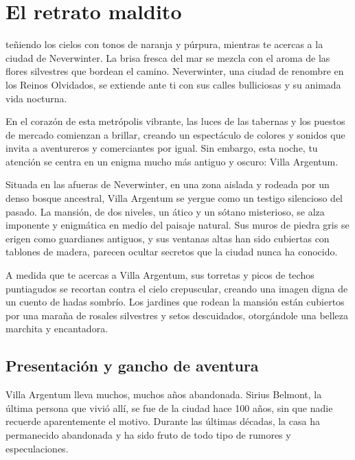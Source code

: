 \documentclass[10pt,twoside,twocolumn,openany]{dndbook}
\begin{document}
\chapter*{El retrato maldito}

 teñiendo los cielos con tonos de naranja y 
púrpura, mientras te acercas a la ciudad de Neverwinter. La brisa fresca del mar se mezcla con 
el aroma de las flores silvestres que bordean el camino. Neverwinter, una ciudad de renombre en los
Reinos Olvidados, se extiende ante ti con sus calles bulliciosas y su animada vida nocturna.

En el corazón de esta metrópolis vibrante, las luces de las tabernas y los puestos de mercado 
comienzan a brillar, creando un espectáculo de colores y sonidos que invita a aventureros y 
comerciantes por igual. Sin embargo, esta noche, tu atención se centra en un enigma mucho más 
antiguo y oscuro: Villa Argentum.

\begin{DndReadAloud}
Situada en las afueras de Neverwinter, en una zona aislada y rodeada por un denso bosque ancestral,
Villa Argentum se yergue como un testigo silencioso del pasado. La mansión, de dos niveles, un 
ático y un sótano misterioso, se alza imponente y enigmática en medio del paisaje natural. Sus 
muros de piedra gris se erigen como guardianes antiguos, y sus ventanas altas han sido cubiertas
con tablones de madera, parecen ocultar secretos que la ciudad nunca ha conocido.

A medida que te acercas a Villa Argentum, sus torretas y picos de techos puntiagudos se recortan 
contra el cielo crepuscular, creando una imagen digna de un cuento de hadas sombrío. Los jardines 
que rodean la mansión están cubiertos por una maraña de rosales silvestres y setos descuidados, 
otorgándole una belleza marchita y encantadora.
\end{DndReadAloud}

\section{Presentación y gancho de aventura}

Villa Argentum lleva muchos, muchos años abandonada. Sirius Belmont, la última persona que vivió 
allí, se fue de la ciudad hace 100 años, sin que nadie recuerde aparentemente el motivo. Durante 
las últimas décadas, la casa ha permanecido abandonada y ha sido fruto de todo tipo de rumores y 
especulaciones.
\end{document}
